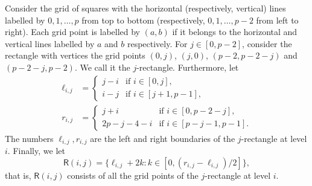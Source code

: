 \documentclass[12pt,reqno]{amsart}
\newcommand{\Rect}{\mathsf{R}}
\theoremstyle{definition}
\numberwithin{equation}{section}
\begin{document}
Consider the grid of squares with the horizontal (respectively, vertical) lines labelled by $0,1,\ldots,p$ from top to bottom (respectively, $0,1,\ldots,p-2$ from left to right). Each grid point is labelled by $(a,b)$ if it belongs to the horizontal and vertical lines labelled by $a$ and $b$ respectively. For $j \in [0, p-2]$, consider the rectangle with vertices the grid points $(0,j)$, $(j,0)$, $(p-2,p-2-j)$ and $(p-2-j,p-2)$. We call it the $j$-rectangle. Furthermore, let 
\begin{align*}
	\ell_{i,j} &= \left \{\begin{array}{ll}
		j-i &\text{if $i \in [0,j]$,} \\ 
		i-j&\text{if $i \in [j+1, p-1]$,} 
	\end{array}\right . \\
	r_{i,j} &= \left \{\begin{array}{ll}
		j+i &\text{if $i \in [0, p-2-j]$,}\\
		2p-j-4-i&\text{if $i \in [p-j-1, p-1]$.}
	\end{array}\right .
\end{align*} The numbers $\ell_{i,j},r_{i,j}$ are the left and right boundaries of the $j$-rectangle at level $i$. Finally, we let \[\Rect(i,j)=\{\ell_{i,j}+2k:k\in [0,(r_{i,j}-\ell_{i,j})/2]\},\] that is, $\Rect(i,j)$ consists of all the grid points of the $j$-rectangle at level $i$. 
\end{document}
